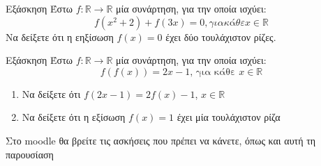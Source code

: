 \documentclass[greek]{beamer}
\begin{document}
\begin{frame}{Εξάσκηση}
 Έστω $f:\mathbb{R}\to\mathbb{R}$ μία συνάρτηση, για την οποία ισχύει:
 $$f(x^2+2)+f(3x)=0{, για κάθε } x\in\mathbb{R}$$
 Να δείξετε ότι η εηξίσωση $f(x)=0$ έχει δύο τουλάχιστον ρίζες.
\end{frame}

\begin{frame}{Εξάσκηση}
 Έστω $f:\mathbb{R}\to\mathbb{R}$ μία συνάρτηση, για την οποία ισχύει:
 $$f\left(f(x)\right)=2x-1\text{, για κάθε } x\in\mathbb{R}$$
 \begin{enumerate}
  \item<1-> Να δείξετε ότι $f(2x-1)=2f(x)-1$, $x\in\mathbb{R}$
  \item<2-> Να δείξετε ότι η εξίσωση $f(x)=1$ έχει μία τουλάχιστον ρίζα
 \end{enumerate}
\end{frame}

\begin{frame}
 Στο moodle θα βρείτε τις ασκήσεις που πρέπει να κάνετε, όπως και αυτή τη παρουσίαση
\end{frame}
\end{document}
